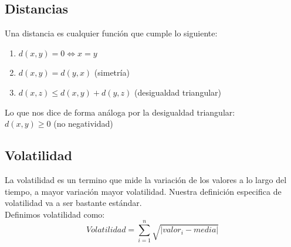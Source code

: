 \documentclass[12pt,a4paper]{article}
\begin{document}
		\subsection{Distancias}

		Una distancia es cualquier función que cumple lo siguiente:\\
			\begin{enumerate}
			\item $d(x,y) = 0 \iff x = y $
			\item $d(x,y) =d(y,x)$ (simetría)
			\item $d(x,z) \leq d(x,y) + d(y,z)$ (desigualdad triangular)
			\end{enumerate}
			Lo que nos dice de forma análoga por la desigualdad triangular:\\
			$d(x,y)\geq 0$ (no negatividad)\\

		\subsection{Volatilidad}
		La volatilidad es un termino que mide la variación de los valores a lo largo del tiempo, a mayor variación mayor volatilidad. Nuestra definición especifica de volatilidad va a ser bastante estándar.\\
		Definimos volatilidad como:\\
		\[Volatilidad = \sum_{i=1}^{n} \sqrt{\left | valor_i - media \right |} \]
\end{document}
